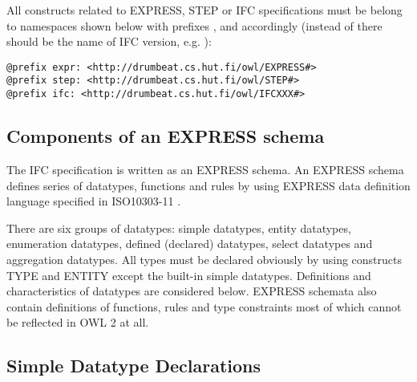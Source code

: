 \begin{principle}[Namespaces]
All constructs related to EXPRESS, STEP or IFC specifications must be belong to namespaces shown below with prefixes ,  and  accordingly (instead of  there should be the name of IFC version, e.g. ):

\begin{lstlisting}
@prefix expr: <http://drumbeat.cs.hut.fi/owl/EXPRESS#>
@prefix step: <http://drumbeat.cs.hut.fi/owl/STEP#>
@prefix ifc: <http://drumbeat.cs.hut.fi/owl/IFCXXX#>
\end{lstlisting}
\end{principle}


\subsection{Components of an EXPRESS schema}
The IFC specification is written as an EXPRESS schema. An EXPRESS schema defines series of data\-types, functions and rules by using EXPRESS data definition language specified in ISO10303-11 \cite{wiki:express,noauthor:ifc-guide}.

There are six groups of data\-types: simple data\-types, entity data\-types, enumeration data\-types, defined (declared) data\-types, select data\-types and aggregation data\-types. All types must be declared obviously by using constructs TYPE and ENTITY except the built-in simple data\-types. Definitions and characteristics of data\-types are considered below. EXPRESS schemata also contain definitions of functions, rules and type constraints most of which cannot be reflected in OWL 2 at all.



\subsection{Simple Datatype Declarations}
\label{subsec:ifcOWL-simple-type}

